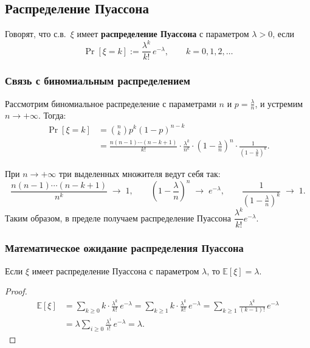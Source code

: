 \subsection{Распределение Пуассона}

\begin{Definition}{}{}
	Говорят, что с.в.\ $\xi$ имеет \textbf{распределение Пуассона} с параметром $\lambda > 0$, если
	\[
	\Pr[\xi = k] := \frac{\lambda^k}{k!}\,e^{-\lambda}, \qquad k = 0, 1, 2, \ldots
	\]
\end{Definition}

\subsubsection*{Связь с биномиальным распределением}

Рассмотрим биномиальное распределение с параметрами $n$ и $p = \tfrac{\lambda}{n}$, и устремим $n \to +\infty$. Тогда:
\begin{align*}
	\Pr[\xi = k]
	&= \binom{n}{k} p^k (1-p)^{n-k} \\
	&= \frac{n(n-1)\cdots(n-k+1)}{k!} \cdot \frac{\lambda^k}{n^k}
	\cdot \left(1 - \frac{\lambda}{n}\right)^n \cdot \frac{1}{\left(1 - \tfrac{\lambda}{n}\right)^k}.
\end{align*}

При $n \to +\infty$ три выделенных множителя ведут себя так:
\[
\frac{n(n-1)\cdots(n-k+1)}{n^k} \;\to\; 1,
\qquad
\left(1 - \frac{\lambda}{n}\right)^n \;\to\; e^{-\lambda},
\qquad
\frac{1}{\left(1 - \tfrac{\lambda}{n}\right)^k} \;\to\; 1.
\]
Таким образом, в пределе получаем распределение Пуассона $\dfrac{\lambda^k}{k!}e^{-\lambda}$.

\subsubsection*{Математическое ожидание распределения Пуассона}

\begin{Statement}{}{}
	Если $\xi$ имеет распределение Пуассона с параметром $\lambda$, то $\mathbb{E}[\xi] = \lambda$.
\end{Statement}

\begin{proof}
\begin{align*}
	\mathbb{E}[\xi]
	&= \sum_{k \geq 0} k \cdot \frac{\lambda^k}{k!}\,e^{-\lambda}
	= \sum_{k \geq 1} k \cdot \frac{\lambda^k}{k!}\,e^{-\lambda}
	= \sum_{k \geq 1} \frac{\lambda^k}{(k-1)!}\,e^{-\lambda} \\
	&= \lambda \sum_{i \geq 0} \frac{\lambda^i}{i!}\,e^{-\lambda}
	= \lambda. 
\end{align*}
\end{proof}

